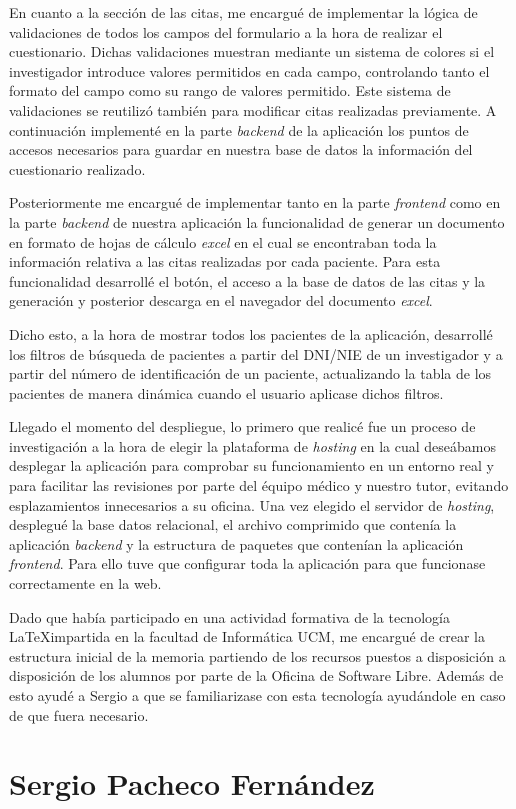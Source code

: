 En cuanto a la sección de las citas, me encargué de implementar la lógica de validaciones de todos los campos del formulario a la hora de realizar el cuestionario. Dichas validaciones muestran mediante un sistema de colores si el investigador introduce valores permitidos en cada campo, controlando tanto el formato del campo como su rango de valores permitido. Este sistema de validaciones se reutilizó también para modificar citas realizadas previamente. A continuación implementé en la parte \textit{backend} de la aplicación los puntos de accesos necesarios para guardar en nuestra base de datos la información  del cuestionario realizado. \newline

Posteriormente me encargué de implementar tanto en la parte \textit{frontend} como en la parte \textit{backend} de nuestra aplicación la funcionalidad de generar un documento en formato de hojas de cálculo \textit{excel} en el cual se encontraban toda la información relativa a las citas realizadas por cada paciente. Para esta funcionalidad desarrollé el botón, el acceso a la base de datos de las citas y la generación y posterior descarga en el navegador del documento \textit{excel}. \newline

Dicho esto, a la hora de mostrar todos los pacientes de la aplicación, desarrollé los filtros de búsqueda de pacientes a partir del DNI/NIE de un investigador y a partir del número de identificación de un paciente, actualizando la tabla de los pacientes de manera dinámica cuando el usuario aplicase dichos filtros. \newline

Llegado el momento del despliegue, lo primero que realicé fue un proceso de investigación a la hora de elegir la plataforma de \textit{hosting} en la cual deseábamos desplegar la aplicación para comprobar su funcionamiento en un entorno real y para facilitar las revisiones por parte del équipo médico y nuestro tutor, evitando esplazamientos innecesarios a su oficina. Una vez elegido el servidor de \textit{hosting}, desplegué la base datos relacional, el archivo comprimido que contenía la aplicación \textit{backend} y la estructura de paquetes que contenían la aplicación \textit{frontend}. Para ello tuve que configurar toda la aplicación para que funcionase correctamente en la web. \newline

Dado que había participado en una actividad formativa de la tecnología \LaTeX   impartida en la facultad de Informática UCM, me encargué de crear la estructura inicial de la memoria partiendo de los recursos puestos a disposición a disposición de los alumnos por parte de la Oficina de Software Libre. Además de esto ayudé a Sergio  a que se familiarizase con esta tecnología ayudándole en caso de que fuera necesario. \newline







\section{Sergio Pacheco Fernández}